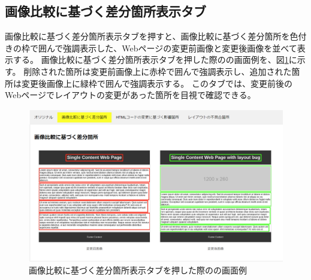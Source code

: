 \subsection{画像比較に基づく差分箇所表示タブ}\label{subsec:images_tab}
画像比較に基づく差分箇所表示タブを押すと、画像比較に基づく差分箇所を色付きの枠で囲んで強調表示した、Webページの変更前画像と変更後画像を並べて表示する。
画像比較に基づく差分箇所表示タブを押した際の\toolName の画面例を、図\ref{fig: Appearance_images_tab}に示す。
削除された箇所は変更前画像上に赤枠で囲んで強調表示し、追加された箇所は変更後画像上に緑枠で囲んで強調表示する。
このタブでは、変更前後のWebページでレイアウトの変更があった箇所を目視で確認できる。
\begin{figure}[tp]
    \begin{center}
        \includegraphics[width=1.0\columnwidth]{image/3_images_tab2.png}
        \caption{画像比較に基づく差分箇所表示タブを押した際の\toolName の画面例}
        \label{fig: Appearance_images_tab}
    \end{center}
\end{figure}

